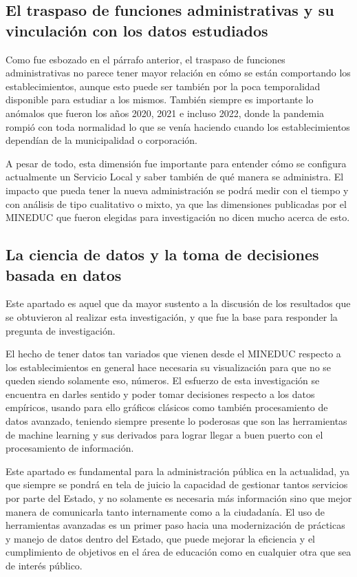 \documentclass[
  12pt,
  letterpaper,
]{article}
\begin{document}
\subsection{El traspaso de funciones administrativas y su vinculación con los datos estudiados}\label{el-traspaso-de-funciones-administrativas-y-su-vinculaciuxf3n-con-los-datos-estudiados}

Como fue esbozado en el párrafo anterior, el traspaso de funciones administrativas no parece tener mayor relación en cómo se están comportando los establecimientos, aunque esto puede ser también por la poca temporalidad disponible para estudiar a los mismos.
También siempre es importante lo anómalos que fueron los años 2020, 2021 e incluso 2022, donde la pandemia rompió con toda normalidad lo que se venía haciendo cuando los establecimientos dependían de la municipalidad o corporación.

A pesar de todo, esta dimensión fue importante para entender cómo se configura actualmente un Servicio Local y saber también de qué manera se administra.
El impacto que pueda tener la nueva administración se podrá medir con el tiempo y con análisis de tipo cualitativo o mixto, ya que las dimensiones publicadas por el MINEDUC que fueron elegidas para investigación no dicen mucho acerca de esto.

\subsection{La ciencia de datos y la toma de decisiones basada en datos}\label{la-ciencia-de-datos-y-la-toma-de-decisiones-basada-en-datos}

Este apartado es aquel que da mayor sustento a la discusión de los resultados que se obtuvieron al realizar esta investigación, y que fue la base para responder la pregunta de investigación.

El hecho de tener datos tan variados que vienen desde el MINEDUC respecto a los establecimientos en general hace necesaria su visualización para que no se queden siendo solamente eso, números.
El esfuerzo de esta investigación se encuentra en darles sentido y poder tomar decisiones respecto a los datos empíricos, usando para ello gráficos clásicos como también procesamiento de datos avanzado, teniendo siempre presente lo poderosas que son las herramientas de machine learning y sus derivados para lograr llegar a buen puerto con el procesamiento de información.

Este apartado es fundamental para la administración pública en la actualidad, ya que siempre se pondrá en tela de juicio la capacidad de gestionar tantos servicios por parte del Estado, y no solamente es necesaria más información sino que mejor manera de comunicarla tanto internamente como a la ciudadanía.
El uso de herramientas avanzadas es un primer paso hacia una modernización de prácticas y manejo de datos dentro del Estado, que puede mejorar la eficiencia y el cumplimiento de objetivos en el área de educación como en cualquier otra que sea de interés público.
\end{document}
